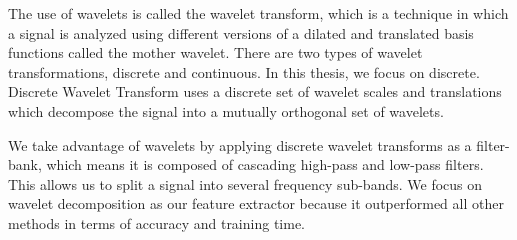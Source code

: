 \documentclass{turabian-thesis}
\begin{document}
The use of wavelets is called the wavelet transform, which is a technique in which a signal is analyzed using different versions of a dilated and translated basis functions called the mother wavelet. There are two types of wavelet transformations, discrete and continuous. In this thesis, we focus on discrete. Discrete Wavelet Transform uses a discrete set of wavelet scales and translations which decompose the signal into a mutually orthogonal set of wavelets. 

We take advantage of wavelets by applying discrete wavelet transforms as a filter-bank, which means it is composed of cascading high-pass and low-pass filters. This allows us to split a signal into several frequency sub-bands. We focus on wavelet decomposition as our feature extractor because it outperformed all other methods in terms of accuracy and training time.















\end{document}

